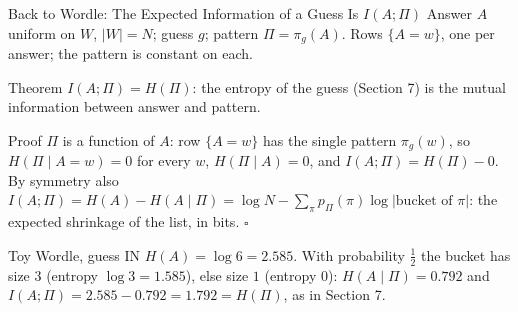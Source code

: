 \begin{frame}{Back to Wordle: The Expected Information of a Guess Is $I(A;\Pi)$}
  \small
  Answer $A$ uniform on $W$, $|W|=N$; guess $g$; pattern $\Pi=\pi_g(A)$. Rows $\{A=w\}$, one per answer; the pattern is constant on each.
  \begin{block}{Theorem}
    $I(A;\Pi)=H(\Pi)$: the entropy of the guess (Section 7) is the mutual information between answer and pattern.
  \end{block}
  \begin{block}{Proof}
    $\Pi$ is a function of $A$: row $\{A=w\}$ has the single pattern $\pi_g(w)$, so $H(\Pi\mid A=w)=0$ for every $w$, $H(\Pi\mid A)=0$, and $I(A;\Pi)=H(\Pi)-0$.
    By symmetry also $I(A;\Pi)=H(A)-H(A\mid\Pi)=\log N-\sum_\pi p_\Pi(\pi)\log|\text{bucket of }\pi|$: the expected shrinkage of the list, in bits. \hfill$\square$
  \end{block}
  \begin{exampleblock}{Toy Wordle, guess \textsf{IN}}
    $H(A)=\log6=2.585$. With probability $\tfrac12$ the bucket has size $3$ (entropy $\log3=1.585$), else size $1$ (entropy $0$): $H(A\mid\Pi)=0.792$ and $I(A;\Pi)=2.585-0.792=1.792=H(\Pi)$, as in Section 7.
  \end{exampleblock}
\end{frame}

